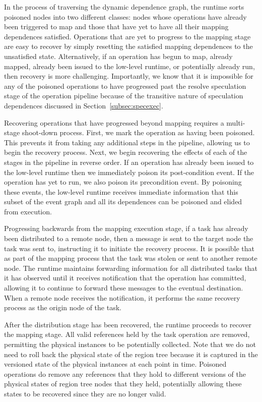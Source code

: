In the process of traversing the dynamic dependence graph,
the runtime sorts poisoned nodes into two different classes:
nodes whose operations have already been triggered to map
and those that have yet to have all their mapping dependences
satisfied. Operations that are yet to progress to the
mapping stage are easy to recover by simply resetting the 
satisfied mapping dependences to the unsatisfied state. 
Alternatively, if an 
operation has begun to map, already mapped, already been 
issued to the low-level runtime, or potentially already 
run, then recovery is more challenging. Importantly, we know
that it is impossible for any of the poisoned operations to
have progressed past the resolve speculation stage of the
operation pipeline because of the transitive nature of
speculation dependences discussed in 
Section~\ref{subsec:specexec}.

Recovering operations that have progressed beyond mapping
requires a multi-stage shoot-down process. First, we mark the operation
as having been poisoned. This prevents it from taking any
additional steps in the pipeline, allowing us to begin the
recovery process. Next, we begin recovering the effects of
each of the stages in the pipeline in reverse order. If an
operation has already been issued to the low-level runtime
then we immediately poison its post-condition event. If
the operation has yet to run, we also poison its precondition
event. By poisoning these events, the low-level
runtime receives immediate information that this subset
of the event graph and all its dependences can be poisoned
and elided from execution.

Progressing backwards from the mapping execution stage, if
a task has already been distributed to a remote node, then
a message is sent to the target node the task was sent to,
instructing it to initiate the recovery process. It is possible
that as part of the mapping process that the task was stolen
or sent to another remote node. The runtime maintains forwarding
information for all distributed tasks that it has observed until
it receives notification that the operation has committed, 
allowing it to continue to forward these messages to the eventual
destination. When a remote node receives the notification, it
performs the same recovery process as the origin node of the task.

After the distribution stage has been recovered, the runtime
proceeds to recover the mapping stage. All valid references
held by the task operation are removed, permitting the physical
instances to be potentially collected. Note that we do not need
to roll back the physical state of the region tree because it
is captured in the versioned state of the physical instances 
at each point in time. Poisoned operations do remove any references
that they hold to different versions of the physical states
of region tree nodes that they held, potentially allowing these
states to be recovered since they are no longer valid.

